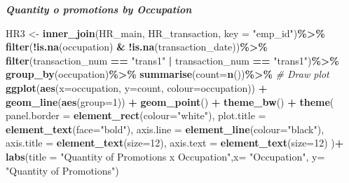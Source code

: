 \documentclass[
]{article}
\newenvironment{Shaded}{\begin{snugshade}}{\end{snugshade}}
\newcommand{\CommentTok}[1]{\textcolor[rgb]{0.56,0.35,0.01}{\textit{#1}}}
\newcommand{\DataTypeTok}[1]{\textcolor[rgb]{0.13,0.29,0.53}{#1}}
\newcommand{\DecValTok}[1]{\textcolor[rgb]{0.00,0.00,0.81}{#1}}
\newcommand{\KeywordTok}[1]{\textcolor[rgb]{0.13,0.29,0.53}{\textbf{#1}}}
\newcommand{\NormalTok}[1]{#1}
\newcommand{\OperatorTok}[1]{\textcolor[rgb]{0.81,0.36,0.00}{\textbf{#1}}}
\newcommand{\StringTok}[1]{\textcolor[rgb]{0.31,0.60,0.02}{#1}}
\begin{document}
\textbf{\emph{Quantity o promotions by Occupation}}

\begin{Shaded}
\begin{Highlighting}[]
\NormalTok{HR3 \textless{}{-}}\StringTok{ }\KeywordTok{inner\_join}\NormalTok{(HR\_main, HR\_transaction, }\DataTypeTok{key =} \StringTok{"emp\_id"}\NormalTok{)}\OperatorTok{\%\textgreater{}\%}
\KeywordTok{filter}\NormalTok{(}\OperatorTok{!}\KeywordTok{is.na}\NormalTok{(occupation) }\OperatorTok{\&}\StringTok{ }\OperatorTok{!}\KeywordTok{is.na}\NormalTok{(transaction\_date))}\OperatorTok{\%\textgreater{}\%}
\KeywordTok{filter}\NormalTok{(transaction\_num }\OperatorTok{==}\StringTok{ "trans1"} \OperatorTok{|}\StringTok{ }\NormalTok{transaction\_num }\OperatorTok{==}\StringTok{ "trans1"}\NormalTok{)}\OperatorTok{\%\textgreater{}\%}
\StringTok{  }\KeywordTok{group\_by}\NormalTok{(}\StringTok{\textasciigrave{}}\DataTypeTok{occupation}\StringTok{\textasciigrave{}}\NormalTok{)}\OperatorTok{\%\textgreater{}\%}
\StringTok{   }\KeywordTok{summarise}\NormalTok{(}\DataTypeTok{count=}\KeywordTok{n}\NormalTok{())}\OperatorTok{\%\textgreater{}\%}
\StringTok{   }\CommentTok{\# Draw plot}
\StringTok{  }\KeywordTok{ggplot}\NormalTok{(}\KeywordTok{aes}\NormalTok{(}\DataTypeTok{x=}\NormalTok{occupation, }\DataTypeTok{y=}\NormalTok{count, }\DataTypeTok{colour=}\NormalTok{occupation)) }\OperatorTok{+}\StringTok{ }
\StringTok{   }\KeywordTok{geom\_line}\NormalTok{(}\KeywordTok{aes}\NormalTok{(}\DataTypeTok{group=}\DecValTok{1}\NormalTok{)) }\OperatorTok{+}\StringTok{ }\KeywordTok{geom\_point}\NormalTok{() }\OperatorTok{+}\StringTok{ }\KeywordTok{theme\_bw}\NormalTok{() }\OperatorTok{+}
\StringTok{   }\KeywordTok{theme}\NormalTok{(}
    \DataTypeTok{panel.border =} \KeywordTok{element\_rect}\NormalTok{(}\DataTypeTok{colour=}\StringTok{"white"}\NormalTok{),}
    \DataTypeTok{plot.title =} \KeywordTok{element\_text}\NormalTok{(}\DataTypeTok{face=}\StringTok{"bold"}\NormalTok{),}
    \DataTypeTok{axis.line =} \KeywordTok{element\_line}\NormalTok{(}\DataTypeTok{colour=}\StringTok{"black"}\NormalTok{),}
    \DataTypeTok{axis.title =} \KeywordTok{element\_text}\NormalTok{(}\DataTypeTok{size=}\DecValTok{12}\NormalTok{),}
    \DataTypeTok{axis.text =} \KeywordTok{element\_text}\NormalTok{(}\DataTypeTok{size=}\DecValTok{12}\NormalTok{)}
\NormalTok{   )}\OperatorTok{+}
\StringTok{  }\KeywordTok{labs}\NormalTok{(}\DataTypeTok{title =} \StringTok{"Quantity of Promotions x Occupation"}\NormalTok{,}\DataTypeTok{x=} \StringTok{"Occupation"}\NormalTok{, }\DataTypeTok{y=} \StringTok{"Quantity of Promotions"}\NormalTok{)}
\end{Highlighting}
\end{Shaded}
\end{document}

